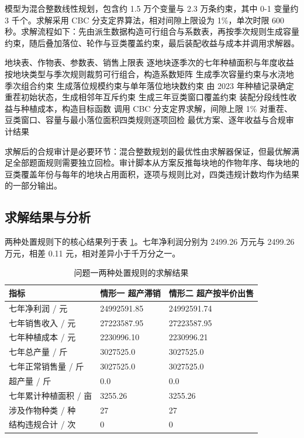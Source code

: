 \documentclass[bwprint]{gmcmthesis}
\begin{document}
模型为混合整数线性规划，包含约 1.5 万个变量与 2.3 万条约束，其中 0-1 变量约 3 千个。求解采用 CBC 分支定界算法，相对间隙上限设为 1\%，单次时限 600 秒。求解流程如下：先由派生数据构造可行组合与系数表，再按季次规则生成容量约束，随后叠加落位、轮作与豆类覆盖约束，最后装配收益与成本并调用求解器。

\begin{algorithm}[htbp]
\caption{问题一混合整数规划求解流程}
\begin{algorithmic}[1]
\Require 地块表、作物表、参数表、销售上限表
\Ensure 逐地块逐季次的七年种植面积与年度收益
\State 按地块类型与季次规则裁剪可行组合，构造系数矩阵
\State 生成季次容量约束与水浇地季次组合约束
\State 生成落位规模约束与单年落位地块数约束
\State 由 2023 年种植记录确定重茬初始状态，生成相邻年互斥约束
\State 生成三年豆类窗口覆盖约束
\State 装配分段线性收益与种植成本，构造目标函数
\State 调用 CBC 分支定界求解，间隙上限 1\%
\State 对重茬、豆类窗口、容量与最小落位面积四类规则逐项回检
\State \Return 最优方案、逐年收益与合规审计结果
\end{algorithmic}
\end{algorithm}

求解后的合规审计是必要环节：混合整数规划的最优性由求解器保证，但最优解满足全部题面规则需要独立回检。审计脚本从方案反推每块地的作物年序、每块地的豆类覆盖年份与每年的地块占用面积，逐项与规则比对，四类违规计数均作为结果的一部分输出。

\subsection{求解结果与分析}

两种处置规则下的核心结果列于表 \ref{tab:q1}。七年净利润分别为 2499.26 万元与 2499.26 万元，相差 0.11 元，相对差异小于千万分之一。

\begin{table}[htbp]
\centering
\renewcommand\arraystretch{1.25}
\begin{tabular}{|p{5.2cm}|p{3.6cm}|p{3.6cm}|}
  \hline
  指标  &  情形一 超产滞销  &  情形二 超产按半价出售 \\
  \hline
  七年净利润 / 元  &  24992591.85  &  24992591.74 \\
  \hline
  七年销售收入 / 元  &  27223587.95  &  27223587.95 \\
  \hline
  七年种植成本 / 元  &  2230996.10  &  2230996.21 \\
  \hline
  七年总产量 / 斤  &  3027525.0  &  3027525.0 \\
  \hline
  七年正常销售量 / 斤  &  3027525.0  &  3027525.0 \\
  \hline
  超产量 / 斤  &  0.0  &  0.0 \\
  \hline
  七年累计种植面积 / 亩  &  3255.26  &  3255.26 \\
  \hline
  涉及作物种类 / 种  &  27  &  27 \\
  \hline
  结构违规合计 / 次  &  0  &  0 \\
  \hline
\end{tabular}
\caption{问题一两种处置规则的求解结果}
\label{tab:q1}
\end{table}
\end{document}
